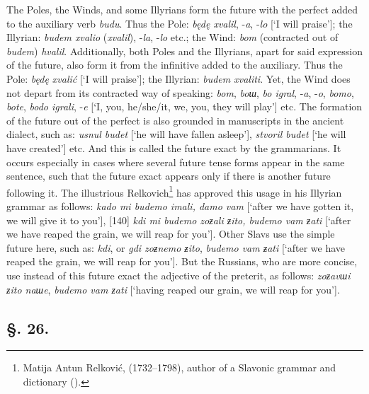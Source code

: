 The Poles, the Winds, and some Illyrians form the future with the perfect added to the auxiliary verb \textit{budu}. Thus the Pole: \textit{będę xvalil}, -\textit{a}, -\textit{lo} [‘I will praise’]; the Illyrian: \textit{budem xvalio} (\textit{xvalil}), -\textit{la}, -\textit{lo} etc.; the Wind: \textit{bom} (contracted out of \textit{budem}) \textit{hvalil}. Additionally, both Poles and the Illyrians, apart for said expression of the future, also form it from the infinitive added to the auxiliary. Thus the Pole: \textit{będę xvalić} [‘I will praise’]; the Illyrian: \textit{budem xvaliti}. Yet, the Wind does not depart from its contracted way of speaking: \textit{bom}, \textit{boш}, \textit{bo igral}, -\textit{a}, -\textit{o}, \textit{bomo}, \textit{bote}, \textit{bodo igrali}, -\textit{e} [‘I, you, he/she/it, we, you, they will play’] etc. The formation of the future out of the perfect is also grounded in manuscripts in the ancient dialect, such as: \textit{usnul budet} [‘he will have fallen asleep’], \textit{stvoril budet} [‘he will have created’] etc. And this is called the future exact by the grammarians. It occurs especially in cases where several future tense forms appear in the same sentence, such that the future exact appears only if there is another future following it. The illustrious Relkovich\footnote{Matija Antun Relković, (1732--1798), author of a Slavonic grammar and dictionary (\citeyear{relkovic_nova_1767}).} has approved this usage in his Illyrian grammar as follows: \textit{kado mi budemo imali, damo vam} [‘after we have gotten it, we will give it to you’], [140] \textit{kdi mi budemo zoƶali ƶito, budemo vam ƶati} [‘after we have reaped the grain, we will reap for you’]. Other Slavs use the simple future here, such as: \textit{kdi}, or \textit{gdi zoƶnemo ƶito}, \textit{budemo vam ƶati} [‘after we have reaped the grain, we will reap for you’]. But the Russians, who are more concise, use instead of this future exact the adjective of the preterit, as follows: \textit{zoƶavшi ƶito naшe}, \textit{budemo vam ƶati} [‘having reaped our grain, we will reap for you’].

\subsection*{\hspace*{\fill}§. 26.\hspace*{\fill}}

